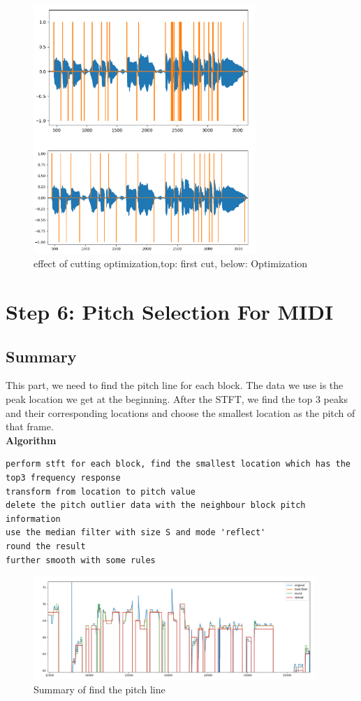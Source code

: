 \documentclass[twoside]{article}
\begin{document}
\begin{figure}[H]
   \centering
   \includegraphics[width = 0.75\textwidth]{optimize.png}  
   \caption{effect of cutting optimization,top: first cut, below: Optimization}
\end{figure}

\section{Step 6: Pitch Selection For MIDI}
\subsection{Summary}
This part, we need to find the pitch line for each block. The data we use is the peak location we get at the beginning. After the STFT, we find the top 3 peaks and their corresponding locations and choose the smallest location as the pitch of that frame.\\
\textbf{Algorithm}\\
\begin{lstlisting}
perform stft for each block, find the smallest location which has the top3 frequency response
transform from location to pitch value
delete the pitch outlier data with the neighbour block pitch information
use the median filter with size S and mode 'reflect'
round the result
further smooth with some rules
\end{lstlisting}

\begin{figure}[H]
   \centering
   \includegraphics[width = 0.95\textwidth]{pitch_selection.png}  
   \caption{Summary of find the pitch line}
\end{figure}
\end{document}
